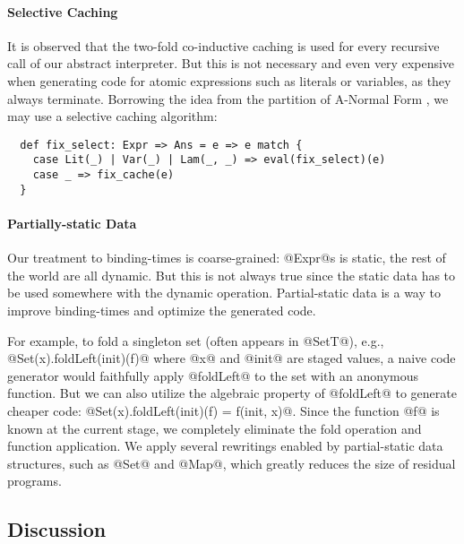 \paragraph{Selective Caching} It is observed that the two-fold co-inductive
caching is used for every recursive call of our abstract interpreter. But this
is not necessary and even very expensive when generating code for atomic
expressions such as literals or variables, as they always terminate. Borrowing
the idea from the partition of A-Normal Form \cite{Flanagan:1993:ECC:155090.155113},
we may use a selective caching algorithm:

\begin{lstlisting}
  def fix_select: Expr => Ans = e => e match {
    case Lit(_) | Var(_) | Lam(_, _) => eval(fix_select)(e)
    case _ => fix_cache(e)
  }
\end{lstlisting}

\paragraph{Partially-static Data}

Our treatment to binding-times is coarse-grained: @Expr@s is static, the rest of
the world are all dynamic. But this is not always true since the static data
has to be used somewhere with the dynamic operation. Partial-static data is a
way to improve binding-times and optimize the generated code.

For example, to fold a singleton set (often appears in @SetT@), e.g.,
@Set(x).foldLeft(init)(f)@ where @x@ and @init@ are staged values, a naive code
generator would faithfully apply @foldLeft@ to the set with an anonymous
function. But we can also utilize the algebraic property of @foldLeft@ to
generate cheaper code: @Set(x).foldLeft(init)(f) = f(init, x)@. Since the
function @f@ is known at the current stage, we completely eliminate the fold
operation and function application. We apply several rewritings enabled by
partial-static data structures, such as @Set@ and @Map@, which greatly reduces
the size of residual programs.


\subsection{Discussion}

